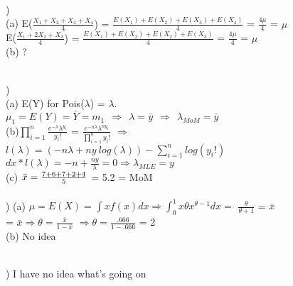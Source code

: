 \documentclass[12pt]{article}
\begin{document}
\noindent \hrulefill \\


)\\
\indent (a) E({\Large{$\frac{X_1+X_2+X_3+X_4}{4}$}) = $\frac{E(X_1)+E(X_2)+E(X_3)+E(X_4)}{4}$} = {\Large $\frac{4\mu}{4}$} = $\mu$\\[.4em]
\indent \indent E({\Large{$\frac{X_1+2X_2+X_3}{4}$}) = $\frac{E(X_1)+E(X_2)+E(X_2)+E(X_3)}{4}$} = {\Large $\frac{4\mu}{4}$} = $\mu$\\[.4em]

\indent (b) ?


\noindent \hrulefill \\


) \\
\indent (a) E(Y) for Pois($\lambda$) = $\lambda$. \\
\indent \indent $\mu_1 = E(Y) = \bar{Y} = m_1 \ \ \Rightarrow \ \ \lambda = \bar{y} \ \ \Rightarrow\ \  \lambda_{MoM} = \bar{y}$\\

\indent (b){\Large$\prod_{i=1}^{n}  \frac{e^{-\lambda}\lambda^{y_i}}{y_i!}$} = {\Large$ \frac{e^{-n\lambda}\lambda^{ny_i}}{\prod_{i=1}^{n}y_i!}$} $\Rightarrow$\\[.4em]
\indent \indent $l(\lambda) = (-n\lambda + ny\ log(\lambda) ) - \sum_{i=1}^{n}log(y_i!)$\\[.4em]
\indent \indent $dx * l(\lambda) = -n + \frac{ny}{\lambda} = 0 \Rightarrow \lambda_{MLE} = y $\\

\indent (c) $\bar{x} = {\Large\frac{7 + 6 + 7 + 2 + 4}{5}}$ = 5.2 = MoM\\


\noindent \hrulefill \\


)
\indent (a) $\mu = E(X) = \int xf(x)dx \Rightarrow \int_0^1x\theta x^{\theta-1}dx =$ {\Large $\frac{\theta}{\theta+1}$} = $\bar{x}$\\[.4em]
\indent {} = $\bar{x} \Rightarrow \theta = ${\Large $\frac{\bar{x}}{1-\bar{x}}$} $\Rightarrow \theta = ${\Large $\frac{.666}{1-.666}$} = 2\\

\indent (b) No idea


\noindent \hrulefill \\


) I have no idea what's going on 
\end{document}
